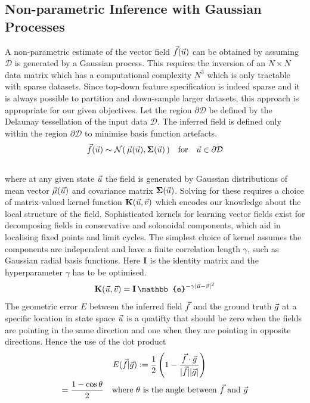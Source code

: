 \subsection{Non-parametric Inference with Gaussian Processes}
A non-parametric estimate of the vector field $\vec{f}(\vec{u})$ can be
obtained by assuming $\mathcal{D}$ is generated by a Gaussian process.
This requires the inversion of an $N\times N$ data matrix which has a computational
complexity $N^3$ which is only tractable with sparse datasets. Since top-down
feature specification is indeed sparse and it is always possible to partition
and down-sample larger datasets, this approach is appropriate for our given
objectives. Let the region $\partial\mathcal{D}$ be defined by the Delaunay tessellation of the
input data $\mathcal{D}$. The inferred field is defined only within the region
$\partial\mathcal{D}$ to minimise basis function artefacts.
\begin{equation}
    \vec{f}(\vec{u})\sim
        \mathcal{N}(\,\vec{\mu}(\vec{u}) ,\mathbf{\Sigma}(\vec{u})\,)
    \quad\mathrm{for}\quad\vec{u}\in\partial\mathcal{D}
\end{equation}\\
where at any given state $\vec{u}$ the field is generated by Gaussian
distributions of mean vector $\vec{\mu}(\vec{u})$ and covariance matrix $\mathbf{\Sigma}(\vec{u})$.
Solving for these requires a choice of matrix-valued kernel function $\mathbf{K}(\vec{u},\vec{v})$
which encodes our knowledge about the local structure of the field.
Sophisticated kernels for learning vector fields exist \cite{Fuselier2017ADecompositions} for decomposing
fields in conservative and solonoidal components, which aid in localising fixed points and
limit cycles. The simplest choice of kernel assumes the components are independent
and have a finite correlation length $\gamma$, such as Gaussian radial basis functions.
Here $\mathbf{I}$ is the identity matrix and the hyperparameter $\gamma$ has to be optimised.
\begin{equation}
    \Matrix{K}(\Vector{u},\Vector{v}) = \Matrix{I}\,\mathbb{e}^{-\gamma|\Vector{u}-\Vector{v}|^2}
\end{equation}
The geometric error $E$ between the inferred field $\vec{f}$ and the ground truth $\vec{g}$ at a specific
location in state space $\vec{u}$ is a quatifty that should be zero
when the fields are pointing in the same direction and one when they are pointing in opposite
directions. Hence the use of the dot product
\begin{align}
    E(\vec{f}|\vec{g}) :=
    \frac{1}{2}
    \left(1-\frac{\vec{f}\cdot\vec{g}}{|\vec{f}||\vec{g}|}\right)\qquad\qquad\quad\\
    = \frac{1-\cos\theta}{2}\quad\text{where $\theta$ is the angle between $\vec{f}$ and $\vec{g}$}
\end{align}
